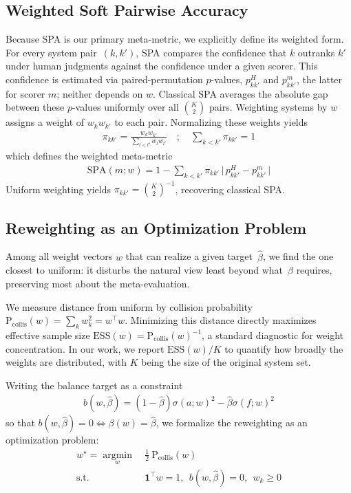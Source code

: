 \documentclass[11pt]{article}
\begin{document}
\subsection{Weighted Soft Pairwise Accuracy}
\label{sec:weighted-spa}

Because SPA is our primary meta-metric, we explicitly define its weighted form. For every system pair~$(k,k')$, SPA compares the confidence that $k$ outranks $k'$ under human judgments against the confidence under a given scorer. This confidence is estimated via paired-permutation $p$-values, $p^{H}_{kk'}$ and $p^{m}_{kk'}$, the latter for scorer $m$; neither depends on $w$. Classical SPA averages the absolute gap between these $p$-values uniformly over all $\binom{K}{2}$ pairs. Weighting systems by $w$ assigns a weight of $w_kw_{k'}$ to each pair. Normalizing these weights yields
\begin{align}
  \pi_{kk'} = \frac{w_kw_{k'}}{\sum_{l<l'}w_lw_{l'}}\quad;
  \quad \sum_{k<k'}\pi_{kk'}=1
\end{align}
which defines the weighted meta-metric
\begin{align}
  \mathrm{SPA}(m;w) = 1 - \sum_{k<k'}
     \pi_{kk'}\,\bigl|\,p^{H}_{kk'} - p^{m}_{kk'}\,\bigr|
  \label{eq:wspa}
\end{align}
Uniform weighting yields $\pi_{kk'} = \binom{K}{2}^{-1}$, recovering classical SPA.


\subsection{Reweighting as an Optimization Problem}

Among all weight vectors $w$ that can realize a given target~$\hat\beta$, we find the one closest to uniform: it disturbs the natural view least beyond what~$\hat\beta$ requires, preserving most about the meta-evaluation.

We measure distance from uniform by collision probability $\mathrm{P}_\mathrm{collis}(w) = \sum_k w_k^2= w^\top w$. Minimizing this distance directly maximizes {effective sample size} $\mathrm{ESS}(w) = \mathrm{P}_\mathrm{collis}(w)^{-1}$, a standard diagnostic for weight concentration. In our work, we report $\mathrm{ESS}(w)/K$ to quantify how broadly the weights are distributed, with $K$ being the size of the original system set.

Writing the balance target as a constraint
\begin{align}
  b(w,\hat\beta) = (1-\hat\beta)\sigma(a;w)^2 - \hat\beta\sigma(f;w)^2\label{eq:b}
\end{align}
so that $b(w,\hat\beta) = 0 \iff \beta(w)=\hat\beta$, we formalize the reweighting as an optimization problem:
\begin{align}
  w^\star = \operatorname*{argmin}_w&\ \tfrac12\ \mathrm{P}_\mathrm{collis}(w) \tag{$\mathcal P$}\label{problem}\\
  \text{s.t.}&\ \mathbf 1^\top w = 1,\ \ b(w,\hat\beta) = 0,\ \ w_k \ge 0 \nonumber
\end{align}
\end{document}
